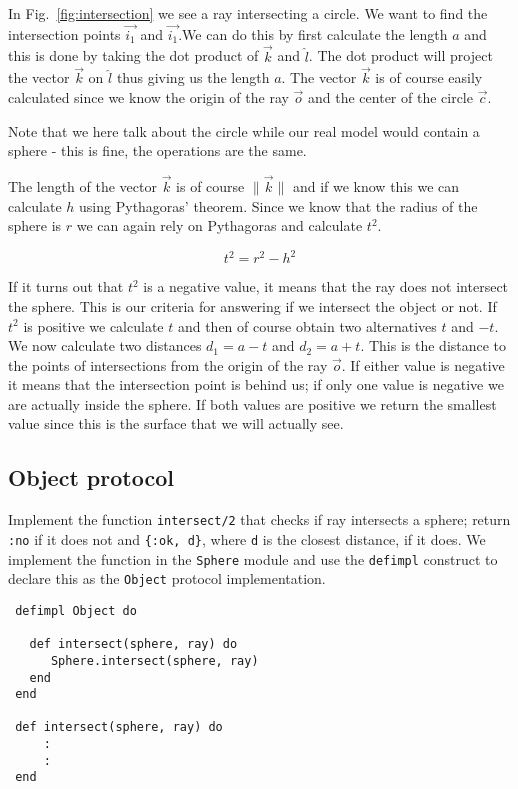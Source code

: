 \documentclass[a4paper,11pt]{article}
\begin{document}
In Fig.~\ref{fig:intersection} we see a ray intersecting a circle. We
want to find the intersection points $\vec{i_1}$ and $\vec{i_1}$.We
can do this by first calculate the length $a$ and this is done by taking
the dot product of $\vec{k}$ and $\hat{l}$. The dot product will
project the vector $\vec{k}$ on $\hat{l}$ thus giving us the
length $a$. The vector $\vec{k}$ is of course easily calculated since we
know the origin of the ray $\vec{o}$ and the center of the circle
$\vec{c}$.

Note that we here talk about the circle while our real model would
contain a sphere - this is fine, the operations are the same.


The length of the vector $\vec{k}$ is of course $\|\vec{k}\|$
and if we know this we can calculate $h$
using Pythagoras' theorem. Since we know that the radius of the
sphere is $r$ we can again rely on Pythagoras and calculate $t^2$.

$$ t^2 = r^2 - h^2 $$

If it turns out that $t^2$ is a negative value, it means that the ray
does not intersect the sphere. This is our criteria for answering if
we intersect the object or not. If $t^2$ is positive we calculate $t$
and then of course obtain two alternatives $t$ and $-t$.  We now
calculate two distances $d_1 = a - t$ and $d_2 = a + t$.  This is the
distance to the points of intersections from the origin of the ray
$\vec{o}$.  If either value is negative it means that the intersection
point is behind us; if only one value is negative we are actually
inside the sphere. If both values are positive we return the smallest
value since this is the surface that we will actually see.

\subsection*{Object protocol}

Implement the function {\tt intersect/2} that checks if ray intersects
a sphere; return {\tt :no} if it does not and {\tt \{:ok, d\}}, where
{\tt d} is the closest distance, if it does. We implement the function
in the {\tt Sphere} module and use the {\tt defimpl} construct to
declare this as the {\tt Object} protocol implementation.

\begin{verbatim}
 defimpl Object do

   def intersect(sphere, ray) do
      Sphere.intersect(sphere, ray)
   end
 end

 def intersect(sphere, ray) do
     :
     :
 end
\end{verbatim}
\end{document}
